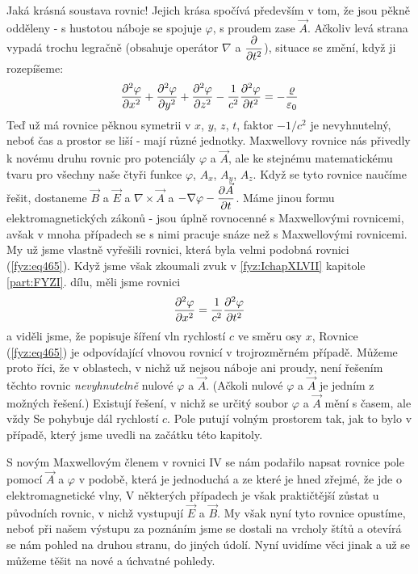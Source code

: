   Jaká krásná soustava rovnic! Jejich krása spočívá především v tom, že jsou pěkně odděleny - s 
  hustotou náboje se spojuje \(\varphi\), s proudem zase \(\vec{A}\). Ačkoliv levá strana vypadá 
  trochu legračně (obsahuje operátor \(\nabla\) a \(\dfrac{\partial }{\partial t^2}\)), situace se změní, když ji 
  rozepíšeme:
  \begin{equation}\label{fyz:eq465}
    \dfrac{\partial^2 \varphi}{\partial x^2} + \dfrac{\partial^2 \varphi}{\partial y^2} + \dfrac{\partial^2 \varphi}{\partial z^2} - \frac{1}{c^2}\dfrac{\partial^2 \varphi}{\partial t^2}
      = - \frac{\varrho}{\varepsilon_0}
  \end{equation} 
  Teď už má rovnice pěknou symetrii v \(x\), \(y\), \(z\), \(t\), faktor \(-1/c^2\) je 
  nevyhnutelný, neboť čas a prostor se liší - mají různé jednotky. Maxwellovy rovnice nás přivedly 
  k novému druhu rovnic pro potenciály \(\varphi\) a \(\vec{A}\), ale ke stejnému matematickému 
  tvaru pro všechny naše čtyři funkce \(\varphi\), \(A_x\), \(A_y\), \(A_z\). Když se tyto rovnice 
  naučíme řešit, dostaneme \(\vec{B}\) a \(\vec{E}\) a \(\nabla\times\vec{A}\) a \(-\nabla\varphi - 
  \dfrac{\partial \vec{A}}{\partial t}\). Máme jinou formu elektromagnetických zákonů - jsou úplně rovnocenné s 
  Maxwellovými rovnicemi, avšak v mnoha případech se s nimi pracuje snáze než s Maxwellovými 
  rovnicemi. My už jsme vlastně vyřešili rovnici, která byla velmi podobná rovnici 
  (\ref{fyz:eq465}). Když jsme však zkoumali zvuk v \ref{fyz:IchapXLVII} kapitole \ref{part:FYZI}. 
  dílu, měli jsme rovnici
  \begin{equation*}
    \dfrac{\partial^2 \varphi}{\partial x^2} = \frac{1}{c^2}\dfrac{\partial^2 \varphi}{\partial t^2}
  \end{equation*} 
  a viděli jsme, že popisuje šíření vln rychlostí \(c\) ve směru osy \(x\), Rovnice 
  (\ref{fyz:eq465}) je odpovídající vlnovou rovnicí v trojrozměrném případě. Můžeme proto říci, že 
  v oblastech, v nichž už nejsou náboje ani proudy, není řešením těchto rovnic \emph{nevyhnutelně} 
  nulové \(\varphi\) a \(\vec{A}\). (Ačkoli nulové \(\varphi\) a \(\vec{A}\) je jedním z možných 
  řešení.) Existují řešení, v nichž se určitý soubor \(\varphi\) a \(\vec{A}\) mění s časem, ale 
  vždy Se pohybuje dál rychlostí \(c\). Pole putují volným prostorem tak, jak to bylo v případě, 
  který jsme uvedli na začátku této kapitoly.
  
  S novým Maxwellovým členem v rovnici IV se nám podařilo napsat rovnice pole pomocí \(\vec{A}\) a 
  \(\varphi\) v podobě, která je jednoduchá a ze které je hned zřejmé, že jde o elektromagnetické 
  vlny, V některých případech je však praktičtější zůstat u původních rovnic, v nichž vystupují 
  \(\vec{E}\) a \(\vec{B}\). My však nyní tyto rovnice opustíme, neboť při našem výstupu za 
  poznáním jsme se dostali na vrcholy štítů a otevírá se nám pohled na druhou stranu, do jiných 
  údolí. Nyní uvidíme věci jinak a už se můžeme těšit na nové a úchvatné pohledy.

  
